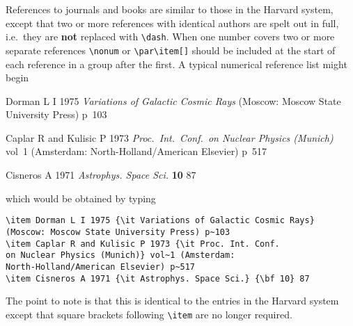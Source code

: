 References to journals and books are similar to those in the Harvard
system, except that two or more references with identical authors are
spelt out in full, i.e.\ they are {\bf not} replaced with \verb"\dash".
When one number covers two or more separate references \verb"\nonum"
or \verb"\par\item[]" should be included at
the start of each reference in a group after the first.
A typical numerical reference list might begin

\smallskip

\item Dorman L I 1975 {\it Variations of Galactic Cosmic Rays} (Moscow:
Moscow State University Press) p~103
\item Caplar R and Kulisic P 1973 {\it Proc.\ Int.\ Conf.\
on Nuclear Physics (Munich)} vol~1 (Amsterdam:
North-Holland/American Elsevier) p~517
\item Cisneros A 1971 {\it Astrophys. Space Sci.} {\bf 10} 87
\endnumrefs
\smallskip

\noindent which would be obtained by typing

\begin{verbatim}
\item Dorman L I 1975 {\it Variations of Galactic Cosmic Rays}
(Moscow: Moscow State University Press) p~103
\item Caplar R and Kulisic P 1973 {\it Proc. Int. Conf.
on Nuclear Physics (Munich)} vol~1 (Amsterdam:
North-Holland/American Elsevier) p~517
\item Cisneros A 1971 {\it Astrophys. Space Sci.} {\bf 10} 87
\end{verbatim}

The point to note is that this is identical to the entries in the
Harvard system except that square brackets following
\verb"\item" are no longer required.

